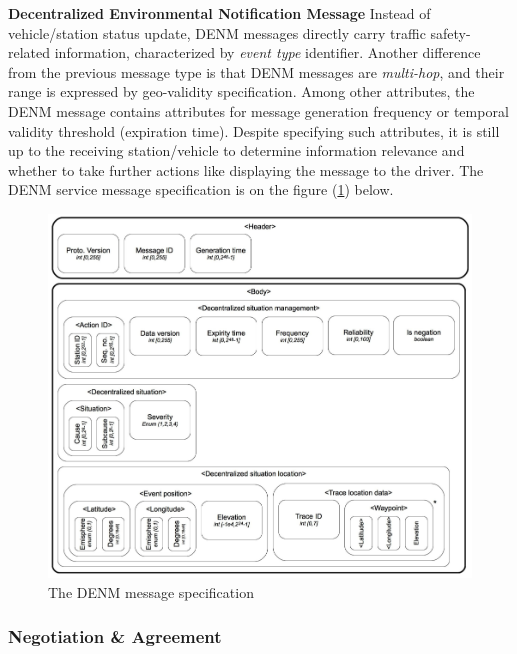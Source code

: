 \documentclass[main.tex]{subfiles}
\begin{document}
\textbf{Decentralized Environmental Notification Message}\smallskip\newline
Instead of vehicle/station status update, DENM messages directly carry traffic safety-related 
information, characterized by \emph{event type} identifier. Another difference from the previous 
message type is that DENM messages are \emph{multi-hop}, and their range is expressed by geo-validity 
specification. Among other attributes, the DENM message contains attributes for message generation 
frequency or temporal validity threshold (expiration time). Despite specifying such 
attributes, it is still up to the receiving station/vehicle to determine information relevance
\cite{ETSI2019} and whether to take further actions like displaying the message to the driver.
The DENM service message specification is on the figure (\ref{denm-spec}) below.

\begin{figure}[htbp]
    \centering
    \includegraphics[width=.9\textwidth]{denm-spec.png}
    \caption{The DENM message specification \cite{Santa2013}}
    \label{denm-spec}
\end{figure}

\subsubsection{Negotiation \& Agreement}
\end{document}
